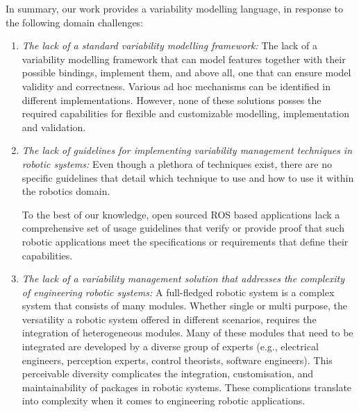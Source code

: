 \documentclass[conference]{IEEEtran}
\begin{document}
In summary, our work provides a variability modelling language, in response to the following domain challenges:
\begin{enumerate}
    \item \textit{The lack of a standard variability modelling framework: }The lack of a variability modelling framework that can model features together with their possible bindings, implement them, and above all, one that can ensure model validity and correctness. Various ad hoc mechanisms can be identified in different implementations. However, none of these solutions posses the required capabilities for flexible and customizable modelling, implementation and validation.
    
    \item \textit{The lack of guidelines for implementing variability management techniques in robotic systems:} Even though a plethora of techniques exist, there are no specific guidelines that detail which technique to use and how to use it within the robotics domain.
    
    To the best of our knowledge, open sourced ROS based applications lack a comprehensive set of usage guidelines that verify or provide proof that such robotic applications meet the specifications or requirements that define their capabilities.
    
    \item \textit{The lack of a variability management solution that addresses the complexity of engineering robotic systems: }A full-fledged robotic system is a complex system that consists of many modules. Whether single or multi purpose, the versatility a robotic system offered in different scenarios, requires the integration of heterogeneous modules. Many of these modules that need to be integrated are developed by a diverse group of experts (e.g., electrical engineers, perception experts, control theorists, software engineers). This perceivable diversity complicates the integration, customisation, and maintainability of packages in robotic systems. These complications translate into complexity when it comes to engineering robotic applications.
\end{enumerate}
\end{document}
